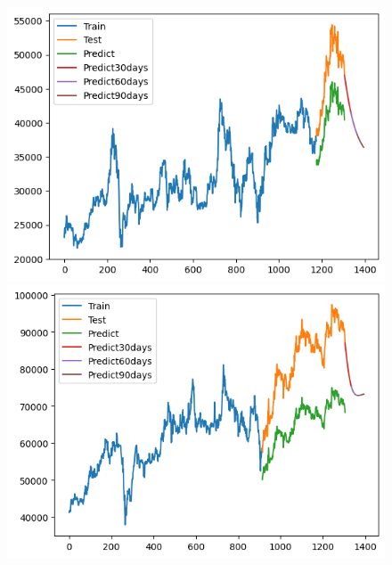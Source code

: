 \begin{figure}[H]
\begin{minipage}{0.15\textwidth}
    \centering
    \includegraphics[width=1\textwidth]{resources/chapter-5/newdata1/result/BIDV_GRU_9_1.png}
    \end{minipage}
    \hfill
    \begin{minipage}{0.15\textwidth}
    \centering
    \includegraphics[width=1\textwidth]{resources/chapter-5/newdata1/result/VCB_GRU_7_3.png}
    \end{minipage}
    \hfill
    \begin{minipage}{0.15\textwidth}
    \centering

\end{minipage}
\end{figure}
